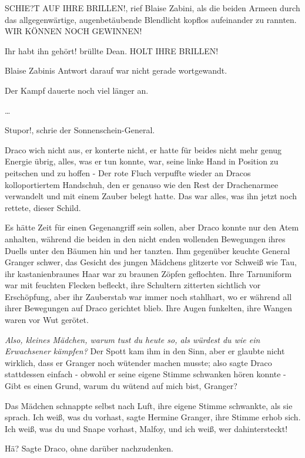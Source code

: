 \glqq{}SCHIE?T AUF IHRE BRILLEN!\grqq{}, rief Blaise Zabini, als die beiden
Armeen durch das allgegenwärtige, augenbetäubende Blendlicht kopflos aufeinander
zu rannten. \glqq{}WIR KÖNNEN NOCH GEWINNEN!\grqq{}

\glqq{}Ihr habt ihn gehört!\grqq{} brüllte Dean. \glqq{}HOLT IHRE BRILLEN!\grqq{}

Blaise Zabinis Antwort darauf war nicht gerade wortgewandt.

Der Kampf dauerte noch viel länger an.

…

\glqq{}Stupor!\grqq{}, schrie der Sonnenschein-General.

Draco wich nicht aus, er konterte nicht, er hatte für beides nicht mehr genug
Energie übrig, alles, was er tun konnte, war, seine linke Hand in Position zu
peitschen und zu hoffen - Der rote Fluch verpuffte wieder an Dracos
kolloportiertem Handschuh, den er genauso wie den Rest der Drachenarmee
verwandelt und mit einem Zauber belegt hatte. Das war alles, was ihn jetzt noch
rettete, dieser Schild.

Es hätte Zeit für einen Gegenangriff sein sollen, aber Draco konnte nur den Atem
anhalten, während die beiden in den nicht enden wollenden Bewegungen ihres
Duells unter den Bäumen hin und her tanzten. Ihm gegenüber keuchte General
Granger schwer, das Gesicht des jungen Mädchens glitzerte vor Schweiß wie Tau,
ihr kastanienbraunes Haar war zu braunen Zöpfen geflochten. Ihre Tarnuniform war
mit feuchten Flecken befleckt, ihre Schultern zitterten sichtlich vor
Erschöpfung, aber ihr Zauberstab war immer noch stahlhart, wo er während all
ihrer Bewegungen auf Draco gerichtet blieb. Ihre Augen funkelten, ihre Wangen
waren vor Wut gerötet.

\emph{Also, kleines Mädchen, warum tust du heute so, als würdest du wie ein
Erwachsener kämpfen?} Der Spott kam ihm in den Sinn, aber er glaubte nicht
wirklich, dass er Granger noch wütender machen musste; also sagte Draco
stattdessen einfach - obwohl er seine eigene Stimme schwanken hören konnte -
\glqq{}Gibt es einen Grund, warum du wütend auf mich bist, Granger?\grqq{}

Das Mädchen schnappte selbst nach Luft, ihre eigene Stimme schwankte, als sie
sprach. \glqq{}Ich weiß, was du vorhast\grqq{}, sagte Hermine Granger, ihre
Stimme erhob sich. \glqq{}Ich weiß, was du und Snape vorhast, Malfoy, und ich
weiß, wer dahintersteckt!\grqq{}

\glqq{}Hä?\grqq{} Sagte Draco, ohne darüber nachzudenken.

